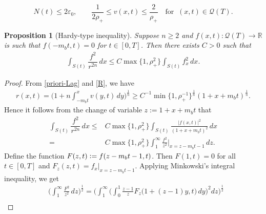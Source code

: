\documentclass[10pt,a4paper]{amsart}
\newtheorem{proposition}{Proposition}
\def\R{\mathbb{R}}
\def\ep{\varepsilon}
\def\mQ{\mathcal{Q}}
\begin{document}
\begin{equation}\label{priori-Lag}
    N(t)\le 2\ep_0, \qquad \frac{1}{2\rho_{+}} \le v(x,t) \le \dfrac{2}{\rho_+} \quad \text{for } \ (x,t)\in \mQ(T).
\end{equation}

\begin{proposition}[Hardy-type inequality] \label{prop:hardy}
    Suppose $n\ge 2$ and $f(x,t): \mQ(T)\to \R$ is such that $f(-m_bt,t)=0$ for $t\in[0,T]$. Then there exists $C>0$ such that
    \begin{align*}
        \int_{S(t)} \dfrac{f^2}{r^{2n}} \, dx
        \le C \max\{1,\rho_{+}^2\} \int_{S(t)} f_x^2 \, dx.
    \end{align*}
\end{proposition}

\begin{proof}
    From \eqref{priori-Lag} and \eqref{R}, we have
    \begin{align*}
        r(x,t) = \Big( 1+ n \int_{-m_b t}^x v(y,t)\, dy \Big)^{\frac{1}{n}} %
        \ge C^{-1} \min\{1,\rho_{+}^{-1}\}^{\frac{1}{n}} (1+ x + m_b t)^{\frac{1}{n}}.
    \end{align*}
    Hence it follows from the change of variable $z:= 1+x+m_b t$ that
    \begin{align}
        \int_{S(t)} \dfrac{f^2}{r^{2n}} \, dx \le& C \max\{1,\rho_{+}^2\}\int_{S(t)} \frac{|f(x,t)|^2}{(1+x+m_b t)^{2}} \, dx\nonumber\\
        =& C\max\{1,\rho_{+}^2\}\int_{1}^{\infty} \frac{f^2}{z^2}\Big\vert_{x=z-m_bt-1} \, dz. \label{temp:minkow}
    \end{align}
    Define the function $F(z,t)\vcentcolon= f(z-m_b t-1,t)$. Then $F(1,t)=0$ for all $t\in[0,T]$ and $F_{z}(z,t) = f_x \vert_{x=z-m_b t-1}$. Applying Minkowski's integral inequality, we get
    \begin{align*}
        &\bigg(\int_{1}^{\infty} \frac{F^2}{z^2} \, d z \bigg)^{\frac{1}{2}}
        =\bigg(\int_{1}^{\infty}\!\!\bigg(\int_{0}^{1}\! \frac{z-1}{z} F_{z}\big( 1+(z-1)y,t\big)\, dy  \bigg)^2 d z\bigg)^{\frac{1}{2}}\\

\end{align*}
\end{proof}
\end{document}
